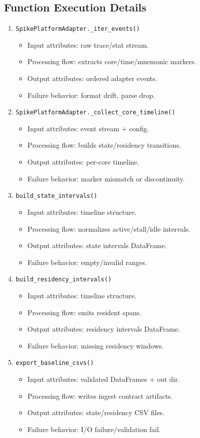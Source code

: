 \documentclass[11pt,a4paper]{article}
\begin{document}
\subsection*{Function Execution Details}
\begin{enumerate}[leftmargin=*]
  \item \texttt{SpikePlatformAdapter.\_iter\_events()}
  \begin{itemize}[leftmargin=*]
    \item Input attributes: raw trace/stat stream.
    \item Processing flow: extracts core/time/mnemonic markers.
    \item Output attributes: ordered adapter events.
    \item Failure behavior: format drift, parse drop.
  \end{itemize}
  \item \texttt{SpikePlatformAdapter.\_collect\_core\_timeline()}
  \begin{itemize}[leftmargin=*]
    \item Input attributes: event stream + config.
    \item Processing flow: builds state/residency transitions.
    \item Output attributes: per-core timeline.
    \item Failure behavior: marker mismatch or discontinuity.
  \end{itemize}
  \item \texttt{build\_state\_intervals()}
  \begin{itemize}[leftmargin=*]
    \item Input attributes: timeline structure.
    \item Processing flow: normalizes active/stall/idle intervals.
    \item Output attributes: state intervals DataFrame.
    \item Failure behavior: empty/invalid ranges.
  \end{itemize}
  \item \texttt{build\_residency\_intervals()}
  \begin{itemize}[leftmargin=*]
    \item Input attributes: timeline structure.
    \item Processing flow: emits resident spans.
    \item Output attributes: residency intervals DataFrame.
    \item Failure behavior: missing residency windows.
  \end{itemize}
  \item \texttt{export\_baseline\_csvs()}
  \begin{itemize}[leftmargin=*]
    \item Input attributes: validated DataFrames + out dir.
    \item Processing flow: writes ingest contract artifacts.
    \item Output attributes: state/residency CSV files.
    \item Failure behavior: I/O failure/validation fail.
  \end{itemize}
\end{enumerate}
\end{document}
